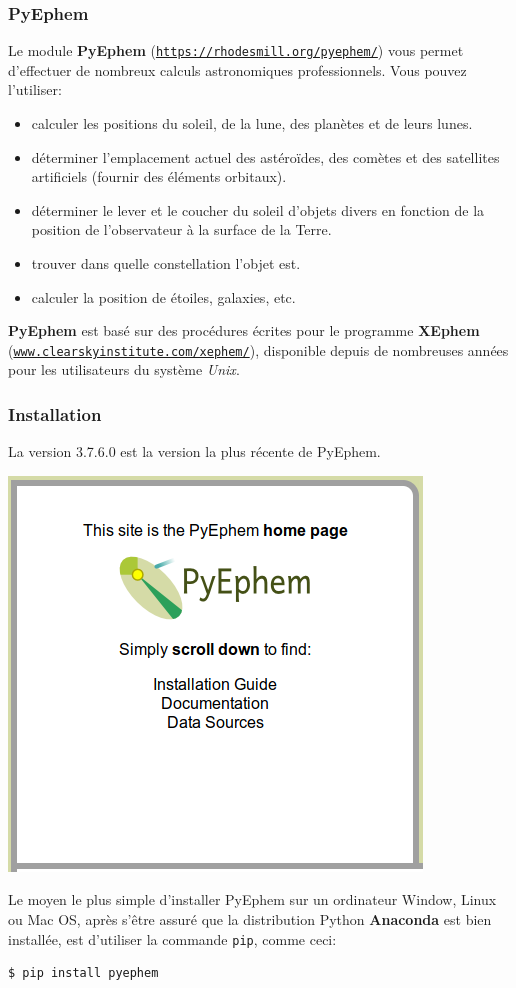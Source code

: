 \documentclass{beamer}
\begin{document}
\begin{frame}
\frametitle{PyEphem}

Le module \textbf{PyEphem} (\href{{https://rhodesmill.org/pyephem/}}{\nolinkurl{https://rhodesmill.org/pyephem/}}) vous permet d'effectuer de nombreux calculs astronomiques professionnels. Vous pouvez l'utiliser:
\begin{itemize}
\item calculer les positions du soleil, de la lune, des planètes et de leurs lunes.

\item déterminer l'emplacement actuel des astéroïdes, des comètes et des satellites artificiels (fournir des éléments orbitaux).

\item déterminer le lever et le coucher du soleil d'objets divers en fonction de la position de l'observateur à la surface de la Terre.

\item trouver dans quelle constellation l'objet est.

\item calculer la position de étoiles, galaxies, etc.
\end{itemize}

\noindent
\textbf{PyEphem} est basé sur des procédures écrites pour le programme \textbf{XEphem} (\href{{www.clearskyinstitute.com/xephem/}}{\nolinkurl{www.clearskyinstitute.com/xephem/}}), disponible depuis de nombreuses années pour les utilisateurs du système \emph{Unix}.


\end{frame}

\begin{frame}
\frametitle{Installation}

La version 3.7.6.0 est la version la plus récente de PyEphem.


\vspace{6mm}

\centerline{\includegraphics[width=0.3\linewidth]{figs/pyephem.png}}

\vspace{6mm}


Le moyen le plus simple d’installer PyEphem sur un ordinateur Window, Linux ou Mac OS, après s’être assuré que la distribution Python \textbf{Anaconda} est bien installée, est d'utiliser la commande \texttt{pip}, comme ceci:
\begin{verbatim}
$ pip install pyephem
\end{verbatim}
\end{frame}
\end{document}
